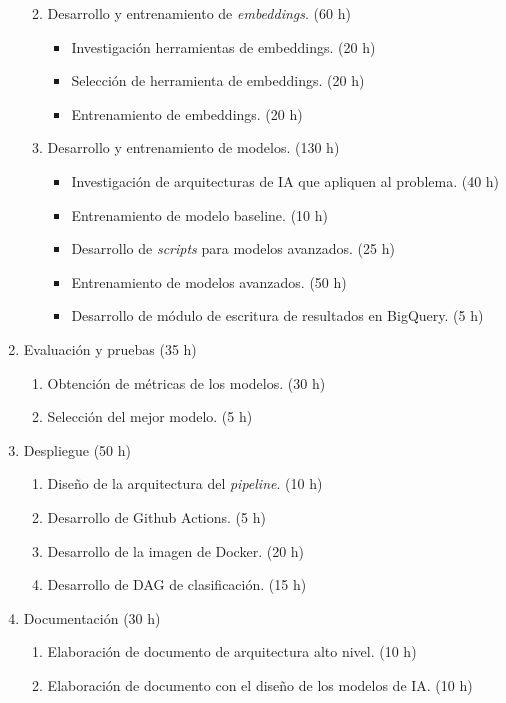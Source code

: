 \documentclass[
11pt, %
]{charter}
\begin{document}
\begin{enumerate}
\begin{enumerate}
\begin{itemize}
				\end{itemize}
			\item Desarrollo y entrenamiento de \textit{embeddings}. (60 h)
				\begin{itemize}
					\item Investigación herramientas de embeddings. (20 h)
					\item Selección de herramienta de embeddings. (20 h)
					\item Entrenamiento de embeddings. (20 h)
				\end{itemize}
			\item Desarrollo y entrenamiento de modelos. (130 h)
				\begin{itemize}
					\item Investigación de arquitecturas de IA que apliquen al problema. (40 h)
					\item Entrenamiento de modelo baseline. (10 h)
					\item Desarrollo de \textit{scripts} para modelos avanzados. (25 h)
					\item Entrenamiento de modelos avanzados. (50 h)
					\item Desarrollo de módulo de escritura de resultados en BigQuery. (5 h)
				\end{itemize}
		\end{enumerate}
	\item Evaluación y pruebas (35 h)
		\begin{enumerate}
			\item Obtención de métricas de los modelos. (30 h)
			\item Selección del mejor modelo. (5 h)
		\end{enumerate}
	\item Despliegue (50 h)
		\begin{enumerate}
			\item Diseño de la arquitectura del \textit{pipeline}. (10 h)
			\item Desarrollo de Github Actions. (5 h)
			\item Desarrollo de la imagen de Docker. (20 h)
			\item Desarrollo de DAG de clasificación. (15 h)
		\end{enumerate}
	\item Documentación (30 h)
		\begin{enumerate}
			\item Elaboración de documento de arquitectura alto nivel. (10 h)
			\item Elaboración de documento con el diseño de los modelos de IA. (10 h)

\end{enumerate}
\end{enumerate}
\end{document}
